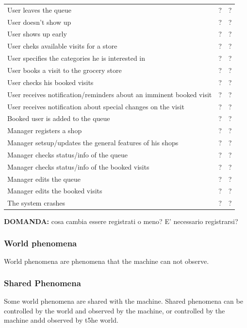 \begin{tabular}{|l|c|c|}
    User leaves the queue & ? & ? \\
    User doesn't show up & ? & ? \\
    User shows up early & ? & ? \\
    \hline
    User cheks available visits for a store & ? & ? \\
    User specifies the categories he is interested in & ? & ? \\
    User books a visit to the grocery store & ? & ? \\
    User checks his booked visits & ? & ? \\
    User receives notification/reminders about an imminent booked visit & ? & ? \\
    User receives notification about special changes on the visit & ? & ? \\
    Booked user is added to the queue & ? & ? \\ %
    \hline
    Manager registers a shop & ? & ? \\
    Manager setsup/updates the general features of his shops & ? & ? \\
    Manager checks status/info of the queue & ? & ? \\
    Manager checks status/info of the booked visits & ? & ? \\
    Manager edits the queue & ? & ? \\
    Manager edits the booked visits & ? & ? \\
    \hline
    The system crashes & ? & ? \\
    \hline
\end{tabular}

\textbf{DOMANDA:} cosa cambia essere registrati o meno? E' necessario registrarsi?

\subsubsection{World phenomena}
\label{subsubsect:worldphenomena}

World phenomena are phenomena that the machine can not observe.

\subsubsection{Shared Phenomena}
\label{subsubsect:sharedphenomena}

Some world phenomena are shared with the machine.
Shared phenomena can be controlled by the world and observed by the machine, or controlled by the machine andd observed by t5he world.
